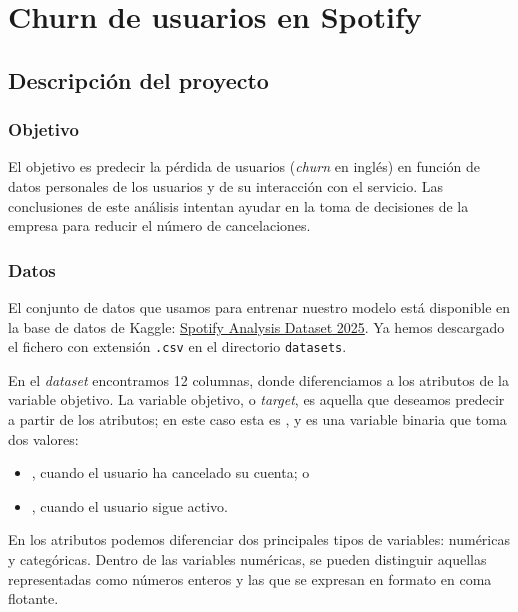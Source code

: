 \section{Churn de usuarios en Spotify}


\subsection{Descripción del proyecto}

\subsubsection{Objetivo}

El objetivo es predecir la pérdida de usuarios (\textit{churn} en inglés) en función de datos personales de los usuarios y de su interacción con el servicio. Las conclusiones de este análisis intentan ayudar en la toma de decisiones de la empresa para reducir el número de cancelaciones.

\subsubsection{Datos}

El conjunto de datos que usamos para entrenar nuestro modelo está disponible en la base de datos de Kaggle: \href{https://www.kaggle.com/datasets/nabihazahid/spotify-dataset-for-churn-analysis/data}{Spotify Analysis Dataset 2025}. 
Ya hemos descargado el fichero con extensión \texttt{.csv} en el directorio \texttt{datasets}.

En el \textit{dataset} encontramos 12 columnas, donde diferenciamos a los atributos de la variable objetivo. 
La variable objetivo, o \textit{target}, es aquella que deseamos predecir a partir de los atributos; 
en este caso esta es , y es una variable binaria que toma dos valores:
\begin{itemize}
    \item {}, cuando el usuario ha cancelado su cuenta; o
    \item {}, cuando el usuario sigue activo.
\end{itemize}

En los atributos podemos diferenciar dos principales tipos de variables: numéricas y categóricas. 
Dentro de las variables numéricas, se pueden distinguir aquellas representadas como números enteros y las que se expresan en formato en coma flotante.

